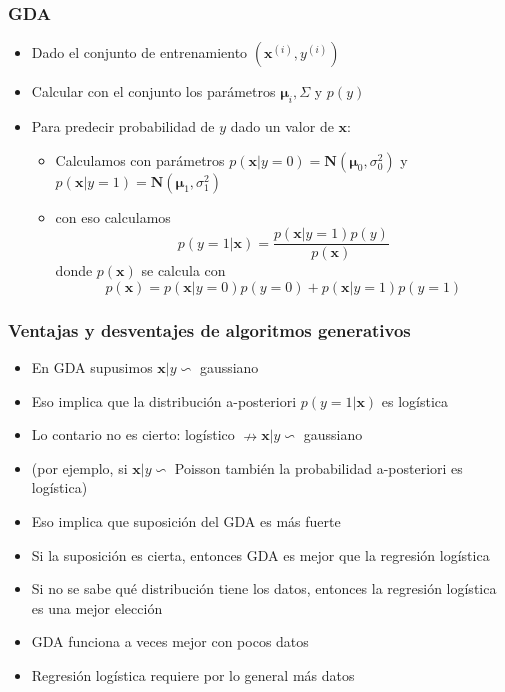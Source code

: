 \documentclass{beamer}
\begin{document}

\begin{frame}
\frametitle{GDA}
\begin{itemize}
\item Dado el conjunto de entrenamiento $(\boldsymbol{x}^{(i)}, y^{(i)})$ 
\item Calcular con el conjunto los parámetros $\boldsymbol{\mu}_i, \Sigma$ y $p(y)$
\item Para predecir probabilidad de $y$ dado un valor de $\boldsymbol{x}$: 
\begin{itemize}
\item Calculamos con parámetros $p(\boldsymbol{x} \vert y=0)= \mathbf{N}(\boldsymbol{\mu}_0,\sigma^2_0)$ y $p(\boldsymbol{x} \vert y=1)= \mathbf{N}(\boldsymbol{\mu}_1,\sigma^2_1)$
\item con eso calculamos 
\begin{equation*}
p(y=1\vert \boldsymbol{x})= \frac{p(\boldsymbol{x}\vert y=1)p(y)}{p(\boldsymbol{x})}
\end{equation*}
donde  $p(\boldsymbol{x})$ se calcula con 
\begin{equation*}
p(\boldsymbol{x})= p(\boldsymbol{x}\vert y=0)p(y=0)+ p(\boldsymbol{x}\vert y=1)p(y=1) 
\end{equation*}

\end{itemize}
\end{itemize}
\end{frame}

\begin{frame}
\frametitle{Ventajas y desventajes de algoritmos generativos }
 \begin{itemize}
 \item En GDA supusimos $\boldsymbol{x}\vert y \backsim$ gaussiano
 \item Eso implica que la distribución a-posteriori $p(y=1 \vert \boldsymbol{x})$ es logística 
 \item Lo contario no es cierto: logístico $\nrightarrow \boldsymbol{x} \vert y \backsim$  gaussiano
 \item (por ejemplo, si $\boldsymbol{x} \vert y \backsim$ Poisson también la probabilidad a-posteriori es logística)
 \item Eso implica que suposición del GDA es más fuerte
 \item Si la suposición es cierta, entonces GDA es mejor que la regresión logística 
 \item Si no se sabe qué distribución tiene los datos, entonces la regresión logística es una mejor elección 
 \item GDA funciona a veces mejor con pocos datos
 \item Regresión logística requiere por lo general más datos
 \end{itemize}
\end{frame}
\end{document}
